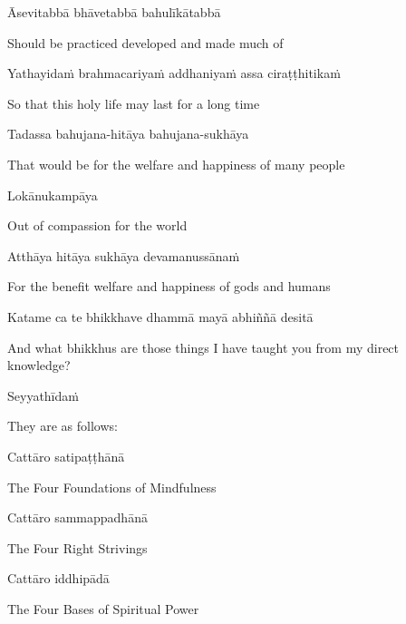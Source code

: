 Āsevitabbā bhāvetabbā bahulīkātabbā

\begin{cprenglish}
  Should be practiced developed and made much of
\end{cprenglish}

Yathayidaṁ brahmacariyaṁ addhaniyaṁ assa ciraṭṭhitikaṁ

\begin{cprenglish}
  So that this holy life may last for a long time
\end{cprenglish}

Tadassa bahujana-hitāya bahujana-sukhāya

\begin{cprenglish}
  That would be for the welfare and happiness of many people
\end{cprenglish}

Lokānukampāya

\begin{cprenglish}
  Out of compassion for the world
\end{cprenglish}

Atthāya hitāya sukhāya devamanussānaṁ

\begin{cprenglish}
  For the benefit welfare and happiness of gods and humans
\end{cprenglish}

Katame ca te bhikkhave dhammā mayā abhiññā desitā

\begin{cprenglish}
  And what bhikkhus are those things I have taught you from my direct knowledge?
\end{cprenglish}

Seyyathīdaṁ

\begin{cprenglish}
  They are as follows:
\end{cprenglish}

Cattāro satipaṭṭhānā

\begin{cprenglish}
  The Four Foundations of Mindfulness
\end{cprenglish}

Cattāro sammappadhānā

\begin{cprenglish}
  The Four Right Strivings
\end{cprenglish}

Cattāro iddhipādā

\begin{cprenglish}
  The Four Bases of Spiritual Power
\end{cprenglish}

